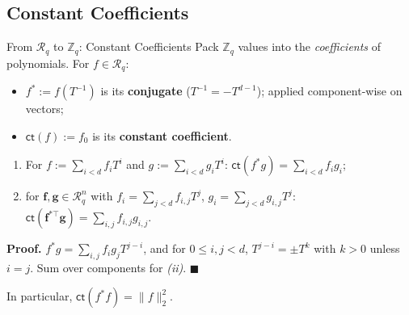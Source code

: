 \documentclass{zkdl-presentation-template}
\begin{document}
    \subsection{Constant Coefficients}

    \begin{frame}{From $\mathcal{R}_q$ to $\mathbb{Z}_q$: Constant Coefficients}
        Pack $\mathbb{Z}_q$ values into the \emph{coefficients} of polynomials. For $f \in \mathcal{R}_q$:
        \begin{itemize}
            \item $f^{\ast} := f(T^{-1})$ is its \textbf{conjugate} ($T^{-1} = -T^{d-1}$); applied component-wise on vectors;
            \item $\mathsf{ct}(f) := f_0$ is its \textbf{constant coefficient}.
        \end{itemize}
        \pause

        \begin{lemma}
            \begin{enumerate}
                \item[\textit{(i)}] For $f := \sum_{i<d} f_iT^i$ and $g := \sum_{i<d} g_iT^i$: $\mathsf{ct}(f^{\ast}g) = \sum_{i<d} f_ig_i$;
                \item[\textit{(ii)}] for $\mathbf{f}, \mathbf{g} \in \mathcal{R}_q^n$ with $f_i = \sum_{j<d} f_{i,j}T^j$, $g_i = \sum_{j<d} g_{i,j}T^j$: $\mathsf{ct}(\mathbf{f}^{\ast\top}\mathbf{g}) = \sum_{i,j} f_{i,j}g_{i,j}$.
            \end{enumerate}
        \end{lemma}
        \pause

        \textbf{Proof.} $f^{\ast}g = \sum_{i,j} f_ig_jT^{j-i}$, and for $0 \leq i,j < d$, $T^{j-i} = \pm T^{k}$ with $k>0$ unless $i = j$. Sum over components for \textit{(ii)}. \hfill $\blacksquare$
        \pause

        \begin{remark}
            In particular, $\mathsf{ct}(f^{\ast}f) = \|f\|_2^2$.
        \end{remark}
    \end{frame}
\end{document}
